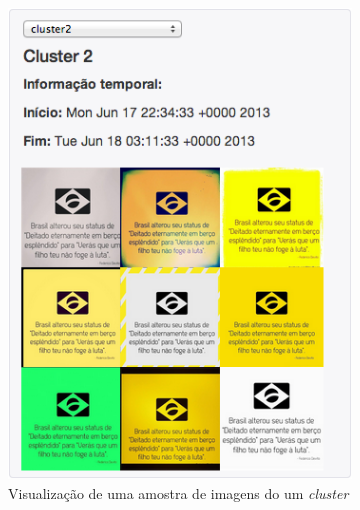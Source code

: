 \begin{figure}[h]
\centering
	\begin{subfigure}[b]{0.32\textwidth}
	\centering
	\includegraphics[width=0.95\linewidth]{./figures/olhopassarinho/c2_ex1_im100_1718}
	\caption{Visualização de uma amostra de imagens do um \textit{cluster} }
	\label{subfig:im01}
	\end{subfigure}
	~
	\begin{subfigure}[b]{0.32\textwidth}
	\centering

\end{subfigure}
\end{figure}
